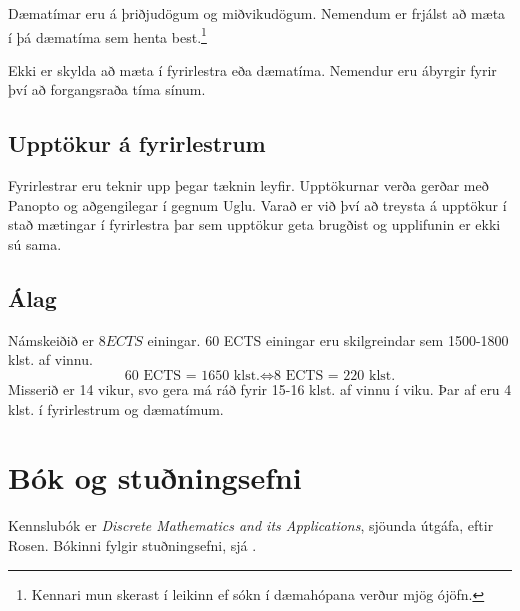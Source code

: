 \documentclass[justified, nobib]{tufte-handout}
\begin{document}
Dæmatímar eru á þriðjudögum og miðvikudögum. Nemendum er frjálst að mæta í þá dæmatíma sem henta best.\footnote{Kennari mun skerast í leikinn ef sókn í dæmahópana verður mjög ójöfn.}

Ekki er skylda að mæta í fyrirlestra eða dæmatíma. Nemendur eru ábyrgir fyrir því að forgangsraða tíma sínum.
\subsection{Upptökur á fyrirlestrum}
Fyrirlestrar eru teknir upp þegar tæknin leyfir.  Upptökurnar verða gerðar með Panopto og aðgengilegar í gegnum Uglu. Varað er við því að treysta á upptökur í stað mætingar í fyrirlestra þar sem upptökur geta brugðist og upplifunin er ekki sú sama.
\subsection{Álag}
Námskeiðið er $8 ECTS$ einingar. 60 ECTS einingar eru skilgreindar sem 1500-1800 klst. af vinnu.
\[
    \text{60 ECTS = 1650 klst.} \Longleftrightarrow \text{8 ECTS = 220 klst.}
\]
Misserið er 14 vikur, svo gera má ráð fyrir 15-16 klst. af vinnu í viku. Þar af eru 4 klst. í fyrirlestrum og dæmatímum.
\section[Bók]{Bók og stuðningsefni}
\label{sec:book}
Kennslubók er \emph{Discrete Mathematics and its Applications}, sjöunda útgáfa, eftir Rosen. Bókinni fylgir stuðningsefni, sjá .
\end{document}
